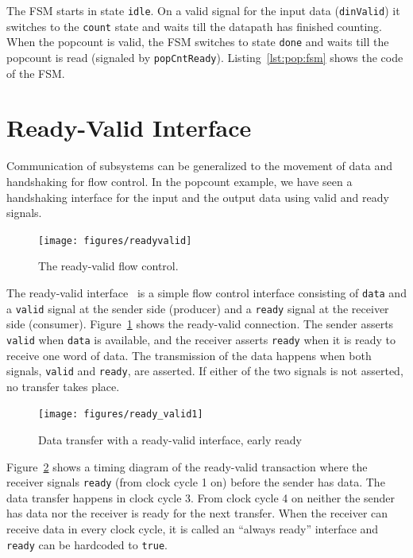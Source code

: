 \documentclass[%
    10pt,
    headinclude, footexclude,
    openright, %
    notitlepage,
    cleardoubleempty,
    headsepline,
    pointlessnumbers,
    bibtotoc, idxtotoc,
    ]{scrbook}
\newcommand{\code}[1]{{\small{\texttt{#1}}}}
\begin{document}
The FSM starts in state \code{idle}. On a valid signal for the input data (\code{dinValid}) it
switches to the \code{count} state and waits till the datapath has finished counting.
When the popcount is valid, the FSM switches to state \code{done} and waits till the
popcount is read (signaled by \code{popCntReady}).
Listing~\ref{lst:pop:fsm} shows the code of the FSM.


\section{Ready-Valid Interface}

Communication of subsystems can be generalized to the movement
of data and handshaking for flow control. In the popcount example,
we have seen a handshaking interface for the input and the output data
using valid and ready signals.

\begin{figure}
  \centering
  \texttt{[image: figures/readyvalid]}
  \caption{The ready-valid flow control.}
  \label{fig:readyvalid}
\end{figure}

The ready-valid interface~\cite[p.~480]{dally:vhdl:2016} is a simple flow
control interface consisting of \code{data} and a \code{valid} signal at the
sender side (producer) and a \code{ready} signal at the receiver side (consumer).
Figure~\ref{fig:readyvalid} shows the ready-valid connection.
The sender asserts \code{valid} when \code{data} is available,
and the receiver asserts \code{ready} when it is ready to receive one word
of data. The transmission of the data happens when both signals, \code{valid}
and \code{ready}, are asserted. If either of the two signals is not asserted,
no transfer takes place.

\begin{figure}
  \centering
  \texttt{[image: figures/ready\_valid1]}
  \caption{Data transfer with a ready-valid interface, early ready}
  \label{fig:ready_valid1}
\end{figure}

Figure~\ref{fig:ready_valid1} shows a timing diagram of the ready-valid
transaction where the receiver signals \code{ready} (from clock cycle 1 on)
before the sender has data. The data transfer happens in clock cycle 3.
From clock cycle 4 on neither the sender has data nor the receiver is ready
for the next transfer.
When the receiver can receive data in every clock cycle, it is called an
``always ready'' interface and \code{ready} can be hardcoded to \code{true}.
\end{document}
